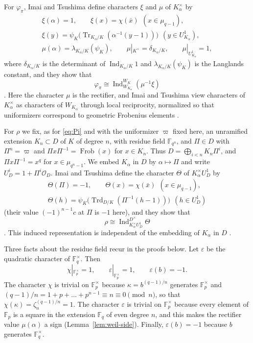 \documentclass[a4paper,11pt]{amsart}
\theoremstyle{definition}
\theoremstyle{remark}
\numberwithin{equation}{section}
\DeclareMathOperator{\Tr}{Tr}
\DeclareMathOperator{\Frob}{Frob}
\newcommand{\F}{\mathbb{F}}
\DeclareMathOperator{\Ind}{Ind}
\DeclareMathOperator{\Trd}{Trd}
\begin{document}
For $\varphi_\pi$, Imai and Tsushima define characters $\xi$ and $\mu$ of $K_\alpha^\times$ by
\begin{gather*}
 \xi(\alpha)=1,\qquad \xi(x)=\chi(\bar x)\ \ (x\in\mu_{q-1}),\\
 \xi(y)=\psi_K\bigl(\Tr_{K_\alpha/K}(\alpha^{-1}(y-1))\bigr)\ \
 (y\in U^1_{K_\alpha}),\\
 \mu(\alpha)=\lambda_{K_\alpha/K}(\psi_K),\qquad \mu|_{K^\times}=\delta_{K_\alpha/K},\qquad \mu|_{U^1_{K_\alpha}}=1,
\end{gather*}
where $\delta_{K_\alpha/K}$ is the determinant of $\Ind_{K_\alpha/K}1$ and $\lambda_{K_\alpha/K}(\psi_K)$ is the Langlands constant, and they show that
\[
 \varphi_\pi\cong\Ind_{W_{K_\alpha}}^{W_K}(\mu^{-1}\xi)
\]
\cite[Proposition~5.4]{IT20}. Here the character $\mu$ is the rectifier, and Imai and Tsushima view characters of $K_\alpha^\times$ as characters of $W_{K_\alpha}$ through local reciprocity, normalized so that uniformizers correspond to geometric Frobenius elements \cite[\S1.1]{IT20}.

For $\rho$ we fix, as for \eqref{eq:Pi} and with the uniformizer $\varpi$ fixed here, an unramified extension $K_n\subset D$ of $K$ of degree $n$, with residue field $\F_{q^n}$, and $\Pi\in D$ with $\Pi^n=\varpi$ and $\Pi x\Pi^{-1}=\Frob(x)$ for $x\in K_n$. Thus $D=\bigoplus_{i<n}K_n\Pi^i$, and $\Pi x\Pi^{-1}=x^q$ for $x\in\mu_{q^n-1}$. We embed $K_\alpha$ in $D$ by $\alpha\mapsto\Pi$ and write $U_D^i=1+\Pi^i\mathcal O_D$. Imai and Tsushima define the character $\Theta$ of $K_\alpha^\times U_D^1$ by
\begin{gather*}
 \Theta(\Pi)=-1,\qquad \Theta(x)=\chi(\bar x)\ \ (x\in\mu_{q-1}),\\
 \Theta(h)=\psi_K\bigl(\Trd_{D/K}(\Pi^{-1}(h-1))\bigr)\ \ (h\in U_D^1)
\end{gather*}
(their value $(-1)^{n-1}c$ at $\Pi$ is $-1$ here), and they show that
\[
 \rho\cong\Ind_{K_\alpha^\times U_D^1}^{D^\times}\Theta
\]
\cite[Proposition~5.4]{IT20}. This induced representation is independent of the embedding of $K_\alpha$ in $D$ \cite[\S5.1]{IT20}.

Three facts about the residue field recur in the proofs below. Let $\varepsilon$ be the quadratic character of $\F_q^\times$. Then
\[
 \chi|_{\F_p^\times}=1,\qquad \varepsilon|_{\F_p^\times}=1,\qquad \varepsilon(b)=-1.
\]
The character $\chi$ is trivial on $\F_p^\times$ because $\kappa=b^{(q-1)/n}$ generates $\F_p^\times$ and $(q-1)/n=1+p+\dots+p^{n-1}\equiv n\equiv0\pmod n$, so that $\chi(\kappa)=\zeta_n^{(q-1)/n}=1$. The character $\varepsilon$ is trivial on $\F_p^\times$ because every element of $\F_p$ is a square in the extension $\F_q$ of even degree $n$, and this makes the rectifier value $\mu(\alpha)$ a sign (Lemma~\ref{lem:weil-side}). Finally, $\varepsilon(b)=-1$ because $b$ generates $\F_q^\times$.
\end{document}
